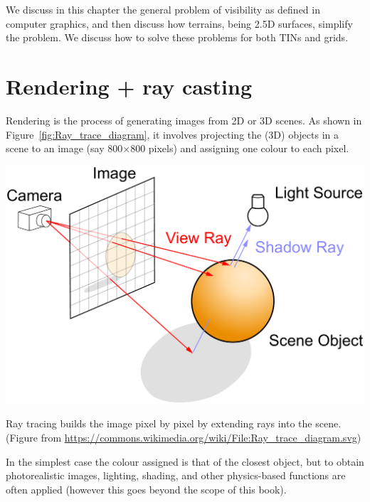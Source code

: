 %

We discuss in this chapter the general problem of visibility as defined in computer graphics, and then discuss how terrains, being 2.5D surfaces, simplify the problem.
We discuss how to solve these problems for both TINs and grids.


%
\section{Rendering + ray casting}

Rendering is the process of generating images from 2D or 3D scenes.
As shown in Figure~\ref{fig:Ray_trace_diagram}, it involves projecting the (3D) objects in a scene to an image (say 800$\times$800 pixels) and assigning one colour to each pixel.
\begin{marginfigure}
  \centering
  \includegraphics[width=\linewidth]{Ray_trace_diagram.pdf}
  \caption{Ray tracing builds the image pixel by pixel by extending rays into the scene. (Figure from \url{https://commons.wikimedia.org/wiki/File:Ray_trace_diagram.svg})}%
  \label{fig:Ray_trace_diagram}
\end{marginfigure}
In the simplest case the colour assigned is that of the closest object, but to obtain photorealistic images, lighting, shading, and other physics-based functions are often applied (however this goes beyond the scope of this book).

%

